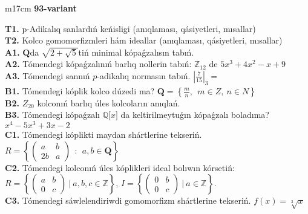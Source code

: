 \documentclass{article}
\begin{document}
\begin{tabular}{m{17cm}}
\textbf{93-variant}
\newline

\textbf{T1.} p-Adikalıq sanlardıń keńisligi (anıqlaması, qásiyetleri, mısallar) \\
\textbf{T2.} Kolco gomomorfizmleri hám ideallar (anıqlaması, qásiyetleri, mısallar) \\
\textbf{A1.} \(\mathbf{Q}\)da \(\sqrt{2 + \sqrt{5}}\)tiń minimal kópaǵzalısın tabıń. \\
\textbf{A2.} Tómendegi kópaǵzalınıń barlıq nollerin tabıń: \(\mathbb{Z}_{12}\) de \(5x^{3} + 4x^{2} - x + 9\) \\
\textbf{A3.} Tómendegi sannıń \(p\)-adikalıq normasın tabıń. \(|\frac{7}{15}|_{3} =\) \\
\textbf{B1.} Tómendegi kóplik kolco dúzedi ma? \(\mathbf{Q} = \left\{ \frac{m}{n},\ \ m \in Z,\ n \in N \right\}\) \\
\textbf{B2.} \(Z_{20}\) kolconıń barlıq úles kolcoların anıqlań. \\
\textbf{B3.} Tómendegi kópaǵzalı \(\mathbb{Q\lbrack}x\rbrack\) da keltirilmeytuǵın kópaǵzalı boladıma? \(x^{4} - 5x^{3} + 3x - 2\) \\
\textbf{C1.} Tómendegi kóplikti maydan shártlerine tekseriń. \(R = \left\{ \begin{pmatrix}
a & b \\
2b & a
\end{pmatrix}\ \ :\ \ a,b \in \mathbf{Q} \right\}\) \\
\textbf{C2.} Tómendegi kolconıń úles kóplikleri ideal bolıwın kórsetiń:
\(R = \left\{ \begin{pmatrix}
a & b \\
0 & c
\end{pmatrix}\ |\ a,b,c \in \mathbb{Z} \right\}\), \(I = \left\{ \begin{pmatrix}
0 & b \\
0 & c
\end{pmatrix}\ |\ a \in \mathbb{Z} \right\}\). \\
\textbf{C3.} Tómendegi sáwlelendiriwdi gomomorfizm shártlerine tekseriń. \(f(x) = \sqrt[3]{x}\) \\

\end{tabular}
\vspace{1cm}
\end{document}
